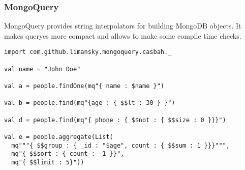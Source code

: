\begin{frame}[fragile]
\frametitle{MongoQuery}
MongoQuery provides string interpolators for building MongoDB objects.  It makes
queryes more compact and allows to make some compile time checks.

\begin{lstlisting}
import com.github.limansky.mongoquery.casbah._

val name = "John Doe"

val a = people.findOne(mq"{ name : $name }")

val b = people.find(mq"{age : { $$lt : 30 } }")

val d = people.find(mq"{ phone : { $$not : { $$size : 0 }}}")

val e = people.aggregate(List(
  mq"""{ $$group : { _id : "$age", count : { $$sum : 1 }}}""",
  mq"{ $$sort : { count : -1 }}",
  mq"{ $$limit : 5}"))
\end{lstlisting}

\end{frame}




